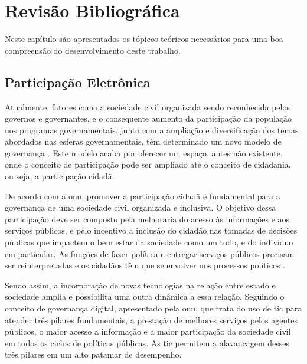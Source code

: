 \chapter[Revisão Bibliográfica]{Revisão Bibliográfica} 
\label{cap:cap2}

Neste capítulo são apresentados os tópicos teóricos necessários para uma boa compreensão do desenvolvimento deste trabalho.

\section{Participação Eletrônica}
\label{sec:e-part}
Atualmente, fatores como a sociedade civil organizada sendo reconhecida pelos governos e governantes, e o consequente aumento da participação da população nos
programas governamentais, junto com a ampliação e diversificação dos temas abordados nas esferas governamentais, têm determinado um novo modelo de governança \cite{o2011government}. 
Este modelo acaba por oferecer um espaço, antes não existente,  onde o conceito de participação pode ser ampliado até o conceito de cidadania, ou seja, a participação cidadã.

\par
De acordo com a \acrshort{onu}, promover a participação cidadã é fundamental para a governança de uma sociedade civil organizada e inclusiva.
O objetivo dessa participação deve ser composto pela melhoraria do acesso às informações e aos serviços públicos,
e pelo incentivo a inclusão do cidadão nas tomadas de decisões públicas que impactem o bem estar da sociedade como um todo, e do indivíduo em particular. 
As funções de fazer política e entregar serviços públicos precisam ser reinterpretadas e os cidadãos têm que se envolver nos processos políticos \cite{bovaird2007beyond}.

\par
Sendo assim, a incorporação de novas tecnologias na relação entre estado e sociedade amplia e possibilita uma outra dinâmica a essa relação. 
Seguindo o conceito de governança digital, apresentado pela \acrshort{onu}, que trata do uso de \acrfull{tic} para atender três pilares fundamentais,
a prestação de melhores serviços pelos agentes públicos, o maior acesso a informação e a maior participação da sociedade civil em todos os ciclos de políticas públicas.
As \acrshort{tic} permitem a alavancagem desses três pilares em um alto patamar de desempenho. 

